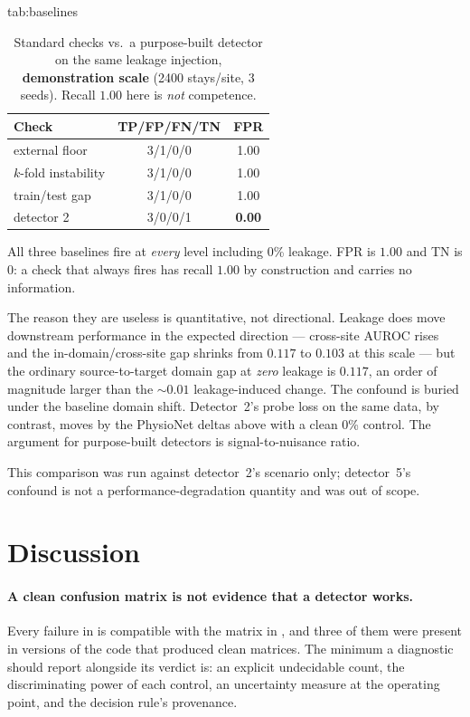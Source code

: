 \documentclass[pmlr,twocolumn,10pt]{jmlr}
\begin{document}
\begin{table}[htbp]
\floatconts
  {tab:baselines}
  {\caption{Standard checks vs.\ a purpose-built detector on the same leakage
   injection, \textbf{demonstration scale} (2400 stays/site, 3 seeds). Recall
   $1.00$ here is \emph{not} competence.}}
  {\small
  \begin{tabular}{@{}lcc@{}}
  \toprule
  \bfseries Check & \bfseries TP/FP/FN/TN & \bfseries FPR\\
  \midrule
  external floor       & 3/1/0/0 & 1.00\\
  $k$-fold instability & 3/1/0/0 & 1.00\\
  train/test gap       & 3/1/0/0 & 1.00\\
  \midrule
  detector 2           & 3/0/0/1 & \bfseries 0.00\\
  \bottomrule
  \end{tabular}}
\end{table}

All three baselines fire at \emph{every} level including 0\% leakage. FPR is
$1.00$ and TN is $0$: a check that always fires has recall $1.00$ by
construction and carries no information.

The reason they are useless is quantitative, not directional. Leakage does move
downstream performance in the expected direction --- cross-site AUROC rises and
the in-domain/cross-site gap shrinks from $0.117$ to $0.103$ at this scale ---
but the ordinary
source-to-target domain gap at \emph{zero} leakage is $0.117$, an order of
magnitude larger than the ${\sim}0.01$ leakage-induced change. The confound is
buried under the baseline domain shift. Detector~2's probe loss on the same
data, by contrast, moves by the PhysioNet deltas above with a clean 0\%
control. The argument for purpose-built detectors is signal-to-nuisance ratio.

This comparison was run against detector~2's scenario only; detector~5's
confound is not a performance-degradation quantity and was out of scope.

\section{Discussion}
\label{sec:discussion}

\paragraph{A clean confusion matrix is not evidence that a detector works.} Every
failure in  is compatible with the matrix in
, and three of them were present in versions of the code that
produced clean matrices. The minimum a diagnostic should report alongside its
verdict is: an explicit undecidable count, the discriminating power of each
control, an uncertainty measure at the operating point, and the decision rule's
provenance.
\end{document}

